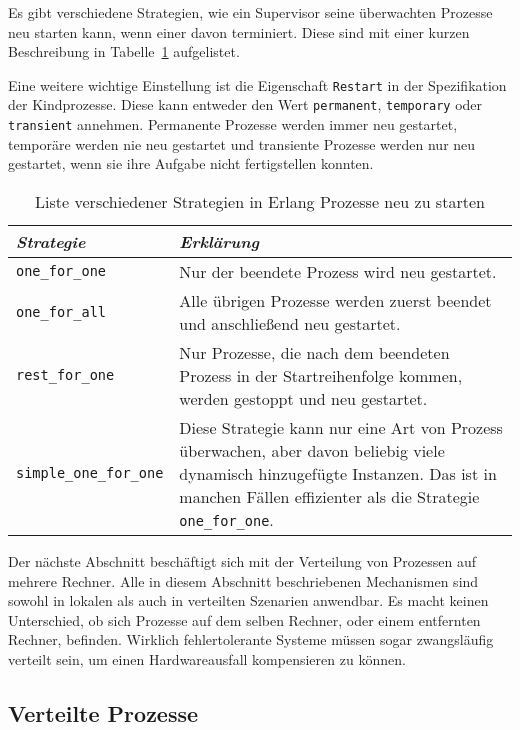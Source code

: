Es gibt verschiedene Strategien, wie ein Supervisor seine überwachten Prozesse neu starten kann, wenn einer davon terminiert. Diese sind mit einer kurzen Beschreibung in Tabelle~\ref{tab:erlang-restart-strategy} aufgelistet.

Eine weitere wichtige Einstellung ist die Eigenschaft \lstinline{Restart} in der Spezifikation der Kindprozesse. Diese kann entweder den Wert \lstinline{permanent}, \lstinline{temporary} oder \lstinline{transient} annehmen. Permanente Prozesse werden immer neu gestartet, temporäre werden nie neu gestartet und transiente Prozesse werden nur neu gestartet, wenn sie ihre Aufgabe nicht fertigstellen konnten.

\begin{table}[!hbt]
\caption{Liste verschiedener Strategien in Erlang Prozesse neu zu starten}
\label{tab:erlang-restart-strategy}
\centering
\begin{tabular}{|l|p{8cm}|}
\hline
\emph{Strategie} & \emph{Erklärung} \\
\hline
\lstinline$one_for_one$ & Nur der beendete Prozess wird neu gestartet. \\
\hline
\lstinline$one_for_all$ & Alle übrigen Prozesse werden zuerst beendet und anschließend neu gestartet. \\
\hline
\lstinline$rest_for_one$ & Nur Prozesse, die nach dem beendeten Prozess in der Startreihenfolge kommen, werden gestoppt und neu gestartet. \\
\hline
\lstinline$simple_one_for_one$ & Diese Strategie kann nur eine Art von Prozess überwachen, aber davon beliebig viele dynamisch hinzugefügte Instanzen. Das ist in manchen Fällen effizienter als die Strategie \lstinline$one_for_one$. \\
\hline
\end{tabular}
\end{table}

Der nächste Abschnitt beschäftigt sich mit der Verteilung von Prozessen auf mehrere Rechner. Alle in diesem Abschnitt beschriebenen Mechanismen sind sowohl in lokalen als auch in verteilten Szenarien anwendbar. Es macht keinen Unterschied, ob sich Prozesse auf dem selben Rechner, oder einem entfernten Rechner, befinden. Wirklich fehlertolerante Systeme müssen sogar zwangsläufig verteilt sein, um einen Hardwareausfall kompensieren zu können.

\subsection{Verteilte Prozesse}

